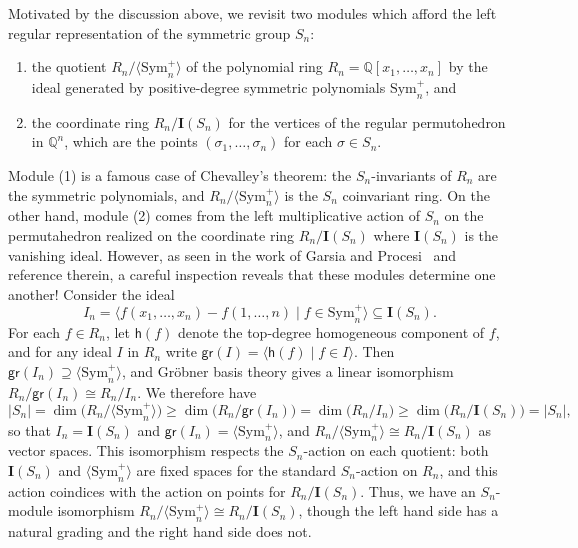 \documentclass[submission]{FPSAC2024}
\theoremstyle{definition}
\theoremstyle{remark}
\numberwithin{equation}{section}
\newcommand{\QQ}{\mathbb{Q}}
\newcommand{\Sym}{\mathrm{Sym}}
\begin{document}
Motivated by the discussion above, we revisit two modules which afford the left regular representation of the symmetric group $S_{n}$:
\begin{enumerate}[itemsep = 1ex]
\item the quotient $R_{n}\big/\langle \Sym_{n}^{+} \rangle$ of the polynomial ring $R_{n} = \QQ[x_{1}, \ldots, x_{n}]$ by the ideal generated by positive-degree symmetric polynomials $\Sym_{n}^{+}$, and

\item the coordinate ring $R_{n} \big/ \mathbf{I}(S_{n})$ for the vertices of the regular permutohedron in $\QQ^{n}$, which are the points $(\sigma_{1}, \ldots, \sigma_{n})$ for each $\sigma \in S_{n}$.

\end{enumerate}
Module (1) is a famous case of Chevalley's theorem: the $S_{n}$-invariants of $R_{n}$ are the symmetric polynomials, and $R_{n}\big/\langle \Sym_{n}^{+} \rangle$ is the $S_{n}$ coinvariant ring.  
On the other hand, module (2) comes from the left multiplicative action of $S_{n}$ on the permutahedron realized on the coordinate ring $R_{n} \big/ \mathbf{I}(S_{n})$  where $\mathbf{I}(S_{n})$ is the vanishing ideal. 
However, as seen in the work of Garsia and Procesi~\cite{GP} and reference therein, a careful inspection reveals that these modules determine one another!  
Consider the ideal
\[
I_{n} = \langle f(x_{1}, \ldots, x_{n}) - f(1, \ldots, n) \;|\; f \in \Sym_{n}^{+} \rangle \subseteq \mathbf{I}(S_{n}).
\]
For each $f \in R_{n}$, let $\mathsf{h}(f)$ denote the top-degree homogeneous component of $f$, and for any ideal $I$ in $R_{n}$ write $\mathsf{gr}(I) = \langle \mathsf{h}(f) \;|\; f \in I \rangle$.  
Then $\mathsf{gr}(I_{n}) \supseteq \langle \Sym_{n}^{+} \rangle$, and Gr\"{o}bner basis theory gives a linear isomorphism $R_{n}\big/\mathsf{gr}(I_{n})  \cong R_{n}\big/I_{n}$.  We therefore have
\[
|S_{n}| = \dim\big(R_{n}\big/\langle \Sym_{n}^{+} \rangle\big) \ge \dim\big(R_{n}\big/\mathsf{gr}(I_{n})\big) = \dim\big(R_{n}\big/I_{n}) \ge \dim(R_{n}\big/\mathbf{I}(S_{n})\big) = |S_{n}|,
\]
so that $I_{n} = \mathbf{I}(S_{n})$ and $\mathsf{gr}(I_{n}) = \langle \Sym_{n}^{+} \rangle$, and $R_{n}\big/\langle \Sym_{n}^{+} \rangle \cong R_{n}\big/\mathbf{I}(S_{n})$ as vector spaces.  
This isomorphism respects the $S_{n}$-action on each quotient: both $\mathbf{I}(S_{n})$ and $\langle \Sym_{n}^{+} \rangle$ are fixed spaces for the standard $S_{n}$-action on $R_{n}$, and this action coindices with the action on points for $R_{n}\big/\mathbf{I}(S_{n})$.  
Thus, we have an $S_{n}$-module isomorphism $R_{n}\big/\langle \Sym_{n}^{+} \rangle \cong R_{n}\big/\mathbf{I}(S_{n})$, though the left hand side has a natural grading and the right hand side does not.
\end{document}

